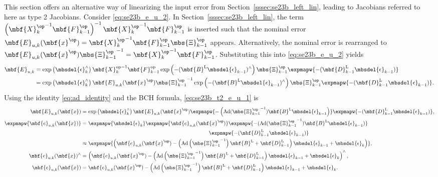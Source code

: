 This section offers an alternative way of linearizing the input error from Section~\ref{sssec:se23b_left_lin}, leading to Jacobians referred to here as type 2 Jacobians. Consider \eqref{eq:se23b_e_u_2}. In Section~\ref{sssec:se23b_left_lin}, the term $\left({\mbf{X}_k^\op}^{-1}\mbf{F}_{k-1}^\op\right)^{-1}{\mbf{X}_k^\op}^{-1}\mbf{F}_{k-1}^\op$ is inserted such that the nominal error $\mbf{E}_{u,k}(\mbf{x}^\op) = {\mbf{X}_k^\op}^{-1}\mbf{F}_{k-1}^\op\mbs{\Xi}_{k-1}^\op$ appears. Alternatively, the nominal error is rearranged to $\mbf{E}_{u,k}(\mbf{x}^\op){\mbs{\Xi}_{k-1}^\op}^{-1} = {\mbf{X}_k^\op}^{-1}\mbf{F}_{k-1}^\op$. Substituting this into \eqref{eq:se23b_e_u_2} yields 
\begin{align}
	\mbf{E}_{u,k} &= \exp\left(\mbsdel{\epsilon}_k^\wedge\right){\mbf{X}_k^\textrm{op}}^{-1} \mbf{F}_{k-1}^\textrm{op}\exp\left(-(\mbf{B}^\textrm{L}\mbsdel{\epsilon}_{k-1})^\wedge\right)\mbs{\Xi}_{k-1}^\op\expmapw{-(\mbf{D}_{k-1}^\textrm{L}\mbsdel{\epsilon}_{k-1})} \notag  \\
	&= \exp\left(\mbsdel{\epsilon}_k^\wedge\right)\mbf{E}_{u,k}(\mbf{x}^\op){\mbs{\Xi}_{k-1}^\op}^{-1}\exp\left(-(\mbf{B}^\textrm{L}\mbsdel{\epsilon}_{k-1})^\wedge\right)\mbs{\Xi}_{k-1}^\op\expmapw{-(\mbf{D}_{k-1}^\textrm{L}\mbsdel{\epsilon}_{k-1})} . \label{eq:se23b_t2_e_u_1}
\end{align}
Using the identity \eqref{eq:ad_identity} and the BCH formula, \eqref{eq:se23b_t2_e_u_1} is
\begin{align*}
	\mbf{E}_{u,k}(\mbf{x}) &= \exp\left(\mbsdel{\epsilon}_k^\wedge\right)\mbf{E}_{u,k}(\mbf{x}^\op)\expmapw{-\left(\textrm{Ad}({\mbs{\Xi}_{k-1}^\op}^{-1})\mbf{B}^\textrm{L}\mbsdel{\epsilon}_{k-1}\right)}\expmapw{-(\mbf{D}_{k-1}^\textrm{L}\mbsdel{\epsilon}_{k-1})}, \\
	\expmapw{\mbf{e}_{u,k}(\mbf{x})} &= \expmapw{\mbsdel{\epsilon}_k}\expmapw{\mbf{e}_{u,k}(\mbf{x}^\op)}\expmapw{-(\textrm{Ad}({\mbs{\Xi}_{k-1}^\op}^{-1})\mbf{B}^\textrm{L}\mbsdel{\epsilon}_{k-1})} \notag \\
	& \qquad \qquad \qquad \qquad\qquad \qquad\qquad \qquad\qquad \qquad \qquad \qquad \expmapw{-(\mbf{D}_{k-1}^\textrm{L}\mbsdel{\epsilon}_{k-1})}\\
	 &\approx \expmapw{\left(\mbf{e}_{u,k}(\mbf{x}^\op) - \left(\textrm{Ad}\left({\mbs{\Xi}_{k-1}^\op}^{-1}\right)\mbf{B}^\textrm{L} + \mbf{D}_{k-1}^\textrm{L}\right)\mbsdel{\epsilon}_{k-1} + \mbsdel{\epsilon}_k\right)}, \\
	 \mbf{e}_{u,k}(\mbf{x})^\wedge &= \left(\mbf{e}_{u,k}(\mbf{x}^\op)-  \left(\textrm{Ad}\left({\mbs{\Xi}_{k-1}^\op}^{-1}\right)\mbf{B}^\textrm{L} + \mbf{D}_{k-1}^\textrm{L}\right)\mbsdel{\epsilon}_{k-1} + \mbsdel{\epsilon}_k\right)^\wedge, \\
	 \mbf{e}_{u,k}(\mbf{x}) &= \mbf{e}_{u,k}(\mbf{x}^\op)- \left(\textrm{Ad}\left({\mbs{\Xi}_{k-1}^\op}^{-1}\right)\mbf{B}^\textrm{L} + \mbf{D}_{k-1}^\textrm{L}\right)\mbsdel{\epsilon}_{k-1} + \mbsdel{\epsilon}_k.
\end{align*}

